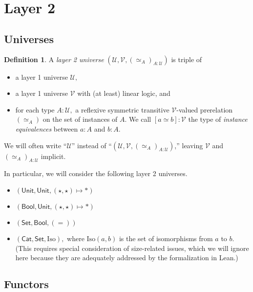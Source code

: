 \documentclass[a4paper]{article}
\theoremstyle{definition}
\newtheorem{definition}{Definition}[section]
\theoremstyle{remark}
\newcommand{\defn}{\emph}
\renewcommand{\equiv}{\simeq}
\newcommand{\U}{\mathcal{U}}
\newcommand{\V}{\mathcal{V}}
\newcommand{\nm}{\mathsf}
\newcommand{\universe}{\nm}
\newcommand{\Unit}{\universe{Unit}}
\newcommand{\Bool}{\universe{Bool}}
\newcommand{\Set}{\universe{Set}}
\newcommand{\Cat}{\universe{Cat}}
\newcommand{\Iso}{\mathrm{Iso}}
\begin{document}
\section{Layer 2}

\subsection{Universes}

\begin{definition}
  A \defn{layer 2 universe} $(\U,\V,(\equiv_A)_{A : \U})$ is triple of
  \begin{itemize}
    \item a layer 1 universe $\U,$
    \item a layer 1 universe $\V$ with (at least) linear logic, and
    \item for each type $A : \U,$ a reflexive symmetric transitive $\V$-valued prerelation
    $(\equiv_A)$ on the set of instances of $A.$ We call $[a \equiv b] : \V$ the type of
    \defn{instance equivalences} between $a : A$ and $b : A.$
  \end{itemize}

  We will often write ``$\U$'' instead of ``$(\U,\V,(\equiv_A)_{A : \U})$,'' leaving $\V$ and
  $(\equiv_A)_{A : \U}$ implicit.
\end{definition}

In particular, we will consider the following layer 2 universes.
\begin{itemize}
  \item $(\Unit, \Unit, (\star,\star) \mapsto \ast)$
  \item $(\Bool, \Unit, (\star,\star) \mapsto \ast)$
  \item $(\Set, \Bool, (=))$
  \item $(\Cat, \Set, \Iso),$ where $\Iso(a,b)$ is the set of isomorphisms from $a$ to $b.$
  (This requires special consideration of size-related issues, which we will ignore here because
  they are adequately addressed by the formalization in Lean.)
\end{itemize}

\subsection{Functors}
\end{document}
